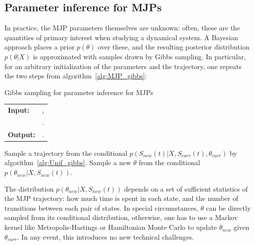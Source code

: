 \subsection{Parameter inference for MJPs}
In practice, the MJP parameters themselves are unknown: often,
these are the quantities of primary interest when studying a dynamical
system. A Bayesian approach
places a prior $p(\theta)$ over these, and the
resulting posterior distribution $p(\theta|X)$ is approximated
with samples drawn by Gibbs sampling. In particular, for an arbitrary 
initialization of the parameters and the trajectory, one repeats the
two steps from algorithm~\ref{alg:MJP_gibbs}:
\begin{algorithm}[H]
  \caption{Gibbs sampling for parameter inference for MJPs}
   \label{alg:MJP_gibbs}
  \begin{tabular}{l l}
   \textbf{Input:  } & \text{A set of partial and noisy observations $X$}, \\
                      & \text{The previous MJP path $S(t) = (S, T)$, the previous MJP parameters $\theta$}.\\ 
   \textbf{Output:  }& \text{A new MJP trajectory $S' (t) = (S', T')$, 
                            new MJP parameters $\theta'$}.\\
   \hline
   \end{tabular}
   \begin{algorithmic}[1]
  \State  Sample a trajectory from the conditional 
  $p(S_{new}(t)|X,S_{curr}(t),\theta_{curr})$ by 
  algorithm~\ref{alg:Unif_gibbs}.
  \State Sample a new $\theta$ from the conditional 
    $p(\theta_{new}|X,S_{new}(t))$.
   \end{algorithmic}
\end{algorithm}
The distribution $p(\theta_{new}|X,S_{new}(t))$ depends on a set of sufficient statistics of the 
MJP trajectory: how
much time is spent in each state, and the number of transitions
between each pair of states. 
In special circumstances, $\theta$ can be directly sampled from its 
conditional distribution, otherwise, one has to use a Markov kernel like
Metropolis-Hastings or Hamiltonian Monte Carlo to update $\theta_{new}$ 
given $\theta_{curr}$. In any event, this introduces no new technical 
challenges.
